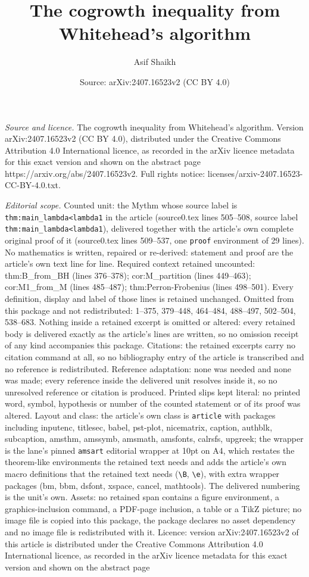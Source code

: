\documentclass[10pt,a4paper]{amsart}
\title[The cogrowth inequality from Whitehead's algorithm]{The cogrowth inequality from Whitehead's algorithm}
\author{Asif Shaikh}
\date{Source: arXiv:2407.16523v2 (CC BY 4.0)}
\begin{document}
\maketitle

\noindent\emph{Source and licence.} The cogrowth inequality from Whitehead's algorithm. Version arXiv:2407.16523v2 (CC BY 4.0), distributed under the Creative Commons Attribution 4.0 International licence, as recorded in the arXiv licence metadata for this exact version and shown on the abstract page https://arxiv.org/abs/2407.16523v2. Full rights notice: licenses/arxiv-2407.16523-CC-BY-4.0.txt.\par\smallskip

\noindent\textit{Editorial scope.} Counted unit: the Mythm whose source label is \texttt{thm:main\_lambda<lambda1} in the article (source0.tex lines 505--508, source label \texttt{thm:main\_lambda<lambda1}), delivered together with the article's own complete original proof of it (source0.tex lines 509--537, one \texttt{proof} environment of 29 lines). No mathematics is written, repaired or re-derived: statement and proof are the article's own text line for line. Required context retained uncounted: thm:B\_from\_BH (lines 376--378); cor:M\_partition (lines 449--463); cor:M1\_from\_M (lines 485--487); thm:Perron-Frobenius (lines 498--501). Every definition, display and label of those lines is retained unchanged. Omitted from this package and not redistributed: 1--375, 379--448, 464--484, 488--497, 502--504, 538--683. Nothing inside a retained excerpt is omitted or altered: every retained body is delivered exactly as the article's lines are written, so no omission receipt of any kind accompanies this package. Citations: the retained excerpts carry no citation command at all, so no bibliography entry of the article is transcribed and no reference is redistributed. Reference adaptation: none was needed and none was made; every reference inside the delivered unit resolves inside it, so no unresolved reference or citation is produced. Printed slips kept literal: no printed word, symbol, hypothesis or number of the counted statement or of its proof was altered. Layout and class: the article's own class is \texttt{article} with packages including inputenc, titlesec, babel, pst-plot, nicematrix, caption, authblk, subcaption, amsthm, amssymb, amsmath, amsfonts, calrsfs, upgreek; the wrapper is the lane's pinned \texttt{amsart} editorial wrapper at 10pt on A4, which restates the theorem-like environments the retained text needs and adds the article's own macro definitions that the retained text needs (\texttt{\textbackslash B}, \texttt{\textbackslash e}), with extra wrapper packages (bm, bbm, dsfont, xspace, cancel, mathtools). The delivered numbering is the unit's own. Assets: no retained span contains a figure environment, a graphics-inclusion command, a PDF-page inclusion, a table or a TikZ picture; no image file is copied into this package, the package declares no asset dependency and no image file is redistributed with it. Licence: version arXiv:2407.16523v2 of this article is distributed under the Creative Commons Attribution 4.0 International licence, as recorded in the arXiv licence metadata for this exact version and shown on the abstract page 
\end{document}
